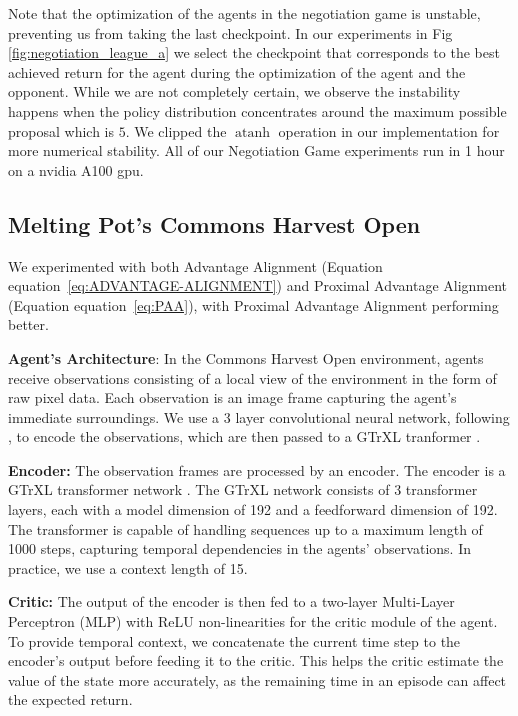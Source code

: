 \documentclass{article} \usepackage{iclr2025_conference,times}
\def\eqref#1{equation~\ref{#1}}
\begin{document}
Note that the optimization of the agents in the negotiation game is unstable, preventing us from taking the last checkpoint. In our experiments in Fig \ref{fig:negotiation_league_a} we select the checkpoint that corresponds to the best achieved return for the agent during the optimization of the agent and the opponent. While we are not completely certain, we observe the instability happens when the policy distribution concentrates around the maximum possible proposal which is $5$. We clipped the $\operatorname{atanh}$ operation in our implementation for more numerical stability. All of our Negotiation Game experiments run in 1 hour on a nvidia A100 gpu.


\subsection{Melting Pot's Commons Harvest Open}
\label{app:CH}

We experimented with both Advantage Alignment (Equation \eqref{eq:ADVANTAGE-ALIGNMENT}) and Proximal Advantage Alignment (Equation \eqref{eq:PAA}), with Proximal Advantage Alignment performing better.

\textbf{Agent's Architecture}: In the Commons Harvest Open environment, agents receive observations consisting of a local view of the environment in the form of raw pixel data. Each observation is an image frame capturing the agent's immediate surroundings. We use a 3 layer convolutional neural network, following \citep{mnih2013playing}, to encode the observations, which are then passed to a GTrXL tranformer \citep{parisotto2019stabilizing}.

\textbf{Encoder:} The observation frames are processed by an encoder. The encoder is a GTrXL transformer network \citep{parisotto2019stabilizing}. The GTrXL network consists of 3 transformer layers, each with a model dimension of 192 and a feedforward dimension of 192. The transformer is capable of handling sequences up to a maximum length of 1000 steps, capturing temporal dependencies in the agents' observations. In practice, we use a context length of 15.

\textbf{Critic:} The output of the encoder is then fed to a two-layer Multi-Layer Perceptron (MLP) with ReLU non-linearities for the critic module of the agent. To provide temporal context, we concatenate the current time step to the encoder's output before feeding it to the critic. This helps the critic estimate the value of the state more accurately, as the remaining time in an episode can affect the expected return.
\end{document}
